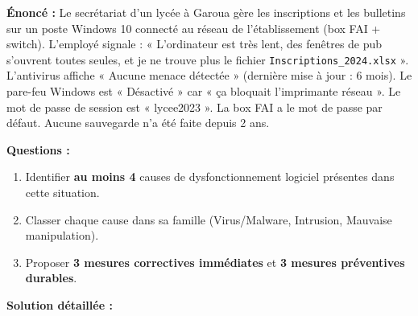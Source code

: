 \documentclass[11pt]{article}
\begin{document}
\begin{exoresolu}
\textbf{Énoncé :} Le secrétariat d'un lycée à Garoua gère les inscriptions et les bulletins sur un poste Windows 10 connecté au réseau de l'établissement (box FAI + switch). L'employé signale : « L'ordinateur est très lent, des fenêtres de pub s'ouvrent toutes seules, et je ne trouve plus le fichier \texttt{Inscriptions\_2024.xlsx} ». L'antivirus affiche « Aucune menace détectée » (dernière mise à jour : 6 mois). Le pare-feu Windows est « Désactivé » car « ça bloquait l'imprimante réseau ». Le mot de passe de session est « lycee2023 ». La box FAI a le mot de passe par défaut. Aucune sauvegarde n'a été faite depuis 2 ans.

\textbf{Questions :}
\begin{enumerate}
    \item Identifier \textbf{au moins 4} causes de dysfonctionnement logiciel présentes dans cette situation.
    \item Classer chaque cause dans sa famille (Virus/Malware, Intrusion, Mauvaise manipulation).
    \item Proposer \textbf{3 mesures correctives immédiates} et \textbf{3 mesures préventives durables}.
\end{enumerate}

\tcblower
\textbf{Solution détaillée :}


\end{exoresolu}
\end{document}
